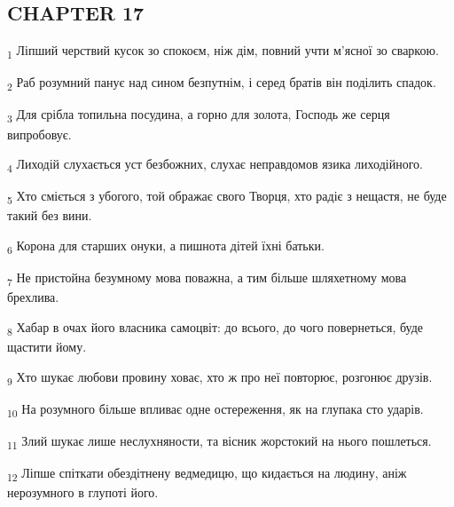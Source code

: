 \subsection{CHAPTER 17}
\begin{tcolorbox}
\textsubscript{1} Ліпший черствий кусок зо спокоєм, ніж дім, повний учти м'ясної зо сваркою.
\end{tcolorbox}
\begin{tcolorbox}
\textsubscript{2} Раб розумний панує над сином безпутнім, і серед братів він поділить спадок.
\end{tcolorbox}
\begin{tcolorbox}
\textsubscript{3} Для срібла топильна посудина, а горно для золота, Господь же серця випробовує.
\end{tcolorbox}
\begin{tcolorbox}
\textsubscript{4} Лиходій слухається уст безбожних, слухає неправдомов язика лиходійного.
\end{tcolorbox}
\begin{tcolorbox}
\textsubscript{5} Хто сміється з убогого, той ображає свого Творця, хто радіє з нещастя, не буде такий без вини.
\end{tcolorbox}
\begin{tcolorbox}
\textsubscript{6} Корона для старших онуки, а пишнота дітей їхні батьки.
\end{tcolorbox}
\begin{tcolorbox}
\textsubscript{7} Не пристойна безумному мова поважна, а тим більше шляхетному мова брехлива.
\end{tcolorbox}
\begin{tcolorbox}
\textsubscript{8} Хабар в очах його власника самоцвіт: до всього, до чого повернеться, буде щастити йому.
\end{tcolorbox}
\begin{tcolorbox}
\textsubscript{9} Хто шукає любови провину ховає, хто ж про неї повторює, розгонює друзів.
\end{tcolorbox}
\begin{tcolorbox}
\textsubscript{10} На розумного більше впливає одне остереження, як на глупака сто ударів.
\end{tcolorbox}
\begin{tcolorbox}
\textsubscript{11} Злий шукає лише неслухняности, та вісник жорстокий на нього пошлеться.
\end{tcolorbox}
\begin{tcolorbox}
\textsubscript{12} Ліпше спіткати обездітнену ведмедицю, що кидається на людину, аніж нерозумного в глупоті його.
\end{tcolorbox}
